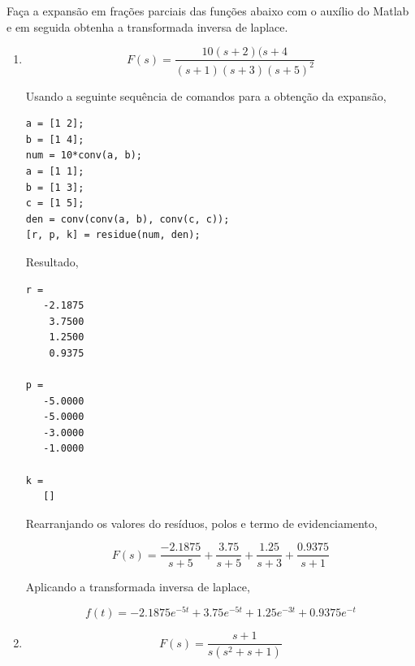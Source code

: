 \documentclass[a4paper, 10pt]{article}
\begin{document}
\begin{list}{\textbf{Questão .}}{
\setlength{\labelwidth}{-2mm} \setlength{\parsep}{0mm}
\setlength{\topsep}{0mm} \setlength{\leftmargin}{0mm}}
\renewcommand{\labelenumi}{(\alph{enumi})}

\item Faça a expansão em frações parciais das funções abaixo com o auxílio do Matlab
e em seguida obtenha a transformada inversa de laplace.
    \begin{enumerate}
        \item       
            $$ 
                F(s) = \frac{10(s+2)(s+4}{(s+1)(s+3)(s+5)^2}
            $$

Usando a seguinte sequência de comandos para a obtenção da expansão,
            \begin{lstlisting}
a = [1 2];
b = [1 4];
num = 10*conv(a, b);
a = [1 1];
b = [1 3];
c = [1 5];
den = conv(conv(a, b), conv(c, c));
[r, p, k] = residue(num, den);

            \end{lstlisting}


        Resultado,

        \begin{lstlisting}
r = 
   -2.1875 
    3.7500
    1.2500
    0.9375

p = 
   -5.0000
   -5.0000
   -3.0000
   -1.0000

k = 
   []

        \end{lstlisting}
        Rearranjando os valores do resíduos, polos e termo de evidenciamento,

            $$
                F(s) = \frac{-2.1875}{s+5} + \frac{3.75}{s+5} + \frac{1.25}{s+3} + \frac{0.9375}{s+1}
            $$

            Aplicando a transformada inversa de laplace,

            $$
            f(t) = -2.1875 e^{-5t} + 3.75 e^{-5t} + 1.25 e^{-3t} + 0.9375 e^{-t}
            $$
         


    \item

        $$
        F(s) = \frac{s+1}{s(s^2+s+1)}
        $$


\end{enumerate}
\end{list}
\end{document}
